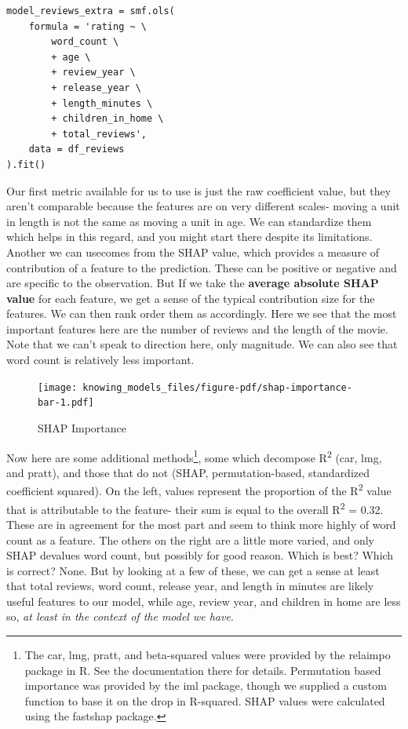 \documentclass[
  letterpaper,
]{krantz}
\begin{document}
\begin{verbatim}
model_reviews_extra = smf.ols(
    formula = 'rating ~ \
        word_count \
        + age \
        + review_year \
        + release_year \
        + length_minutes \
        + children_in_home \
        + total_reviews',
    data = df_reviews
).fit()
\end{verbatim}

Our first metric available for us to use is just the raw coefficient
value, but they aren't comparable because the features are on very
different scales- moving a unit in length is not the same as moving a
unit in age. We can standardize them which helps in this regard, and you
might start there despite its limitations. Another we can usecomes from
the SHAP value, which provides a measure of contribution of a feature to
the prediction. These can be positive or negative and are specific to
the observation. But If we take the \textbf{average absolute SHAP value}
for each feature, we get a sense of the typical contribution size for
the features. We can then rank order them as accordingly. Here we see
that the most important features here are the number of reviews and the
length of the movie. Note that we can't speak to direction here, only
magnitude. We can also see that word count is relatively less important.

\begin{figure}[H]

{\centering \texttt{[image: knowing\_models\_files/figure-pdf/shap-importance-bar-1.pdf]}

}

\caption{SHAP Importance}

\end{figure}%

Now here are some additional methods\footnote{The car, lmg, pratt, and
  beta-squared values were provided by the {relaimpo} package in R. See
  the documentation there for details. Permutation based importance was
  provided by the {iml} package, though we supplied a custom function to
  base it on the drop in R-squared. SHAP values were calculated using
  the {fastshap} package.}, some which decompose R\textsuperscript{2}
(car, lmg, and pratt), and those that do not (SHAP, permutation-based,
standardized coefficient squared). On the left, values represent the
proportion of the R\textsuperscript{2} value that is attributable to the
feature- their sum is equal to the overall R\textsuperscript{2} = 0.32.
These are in agreement for the most part and seem to think more highly
of word count as a feature. The others on the right are a little more
varied, and only SHAP devalues word count, but possibly for good reason.
Which is best? Which is correct? None. But by looking at a few of these,
we can get a sense at least that total reviews, word count, release
year, and length in minutes are likely useful features to our model,
while age, review year, and children in home are less so, \emph{at least
in the context of the model we have}.
\end{document}
